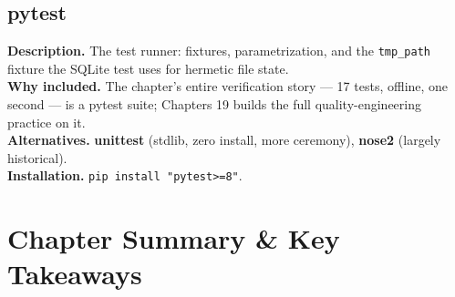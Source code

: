 \subsection{pytest}
\textbf{Description.} The test runner: fixtures, parametrization, and the
\texttt{tmp\_path} fixture the SQLite test uses for hermetic file state.\\
\textbf{Why included.} The chapter's entire verification story --- 17 tests,
offline, one second --- is a pytest suite; Chapters 19 builds the full
quality-engineering practice on it.\\
\textbf{Alternatives.} \textbf{unittest} (stdlib, zero install, more
ceremony), \textbf{nose2} (largely historical).\\
\textbf{Installation.} \texttt{pip install "pytest>=8"}.

\section{Chapter Summary \& Key Takeaways}
\label{sec:ch6-summary}

